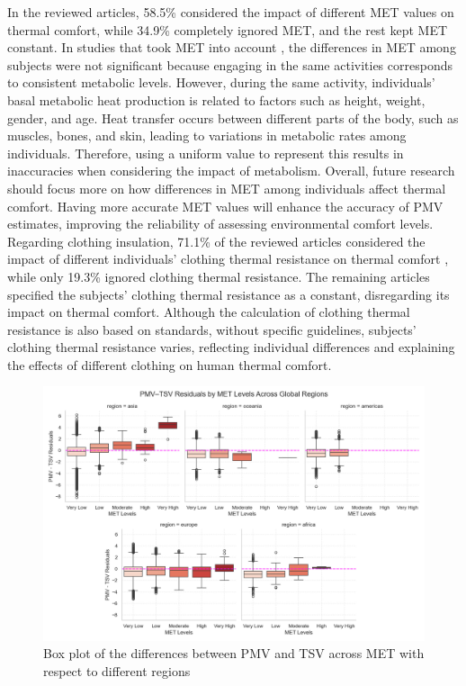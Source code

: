 \documentclass[final,3p,times,12pt]{elsarticle}
\begin{document}
In the reviewed articles, 58.5\% considered the impact of different MET values on thermal comfort, while 34.9\% completely ignored MET, and the rest kept MET constant. In studies that took MET into account \cite{bragerComparisonMethodsAssessing,arensAreClassTemperature2010}, the differences in MET among subjects were not significant because engaging in the same activities corresponds to consistent metabolic levels. However, during the same activity, individuals' basal metabolic heat production is related to factors such as height, weight, gender, and age. Heat transfer occurs between different parts of the body, such as muscles, bones, and skin, leading to variations in metabolic rates among individuals. Therefore, using a uniform value to represent this results in inaccuracies when considering the impact of metabolism. Overall, future research should focus more on how differences in MET among individuals affect thermal comfort. Having more accurate MET values will enhance the accuracy of PMV estimates, improving the reliability of assessing environmental comfort levels. Regarding clothing insulation, 71.1\% of the reviewed articles considered the impact of different individuals' clothing thermal resistance on thermal comfort \cite{suComfortableClothingModel2022,bragerOperableWindowsPersonal,devecchiThermalComfortOffice2017,stoopsPhysicalEnvironmentOccupant}, while only 19.3\% ignored clothing thermal resistance. The remaining articles specified the subjects' clothing thermal resistance as a constant, disregarding its impact on thermal comfort. Although the calculation of clothing thermal resistance is also based on standards, without specific guidelines, subjects' clothing thermal resistance varies, reflecting individual differences and explaining the effects of different clothing on human thermal comfort. 

\begin{figure}[h!]
    \centering
    \includegraphics[width=1.0\linewidth]{facet_met_residuals_new.jpg}
    \caption{Box plot of the differences between PMV and TSV across MET with respect to different regions}
    \label{8}
\end{figure}
\end{document}
